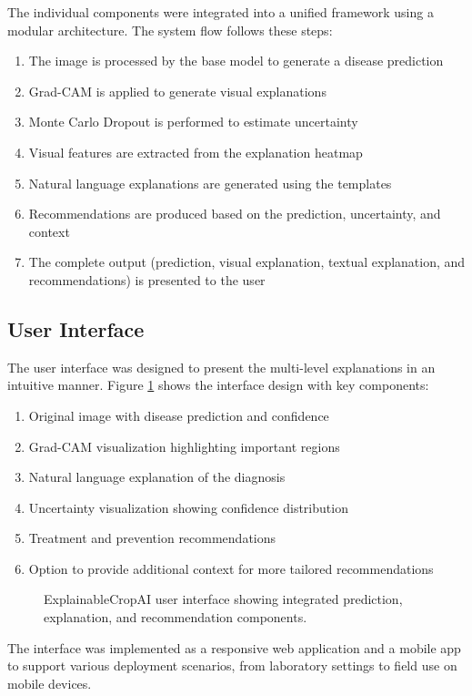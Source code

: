 The individual components were integrated into a unified framework using a modular architecture. The system flow follows these steps:

\begin{enumerate}
    \item The image is processed by the base model to generate a disease prediction
    \item Grad-CAM is applied to generate visual explanations
    \item Monte Carlo Dropout is performed to estimate uncertainty
    \item Visual features are extracted from the explanation heatmap
    \item Natural language explanations are generated using the templates
    \item Recommendations are produced based on the prediction, uncertainty, and context
    \item The complete output (prediction, visual explanation, textual explanation, and recommendations) is presented to the user
\end{enumerate}

\subsection{User Interface}

The user interface was designed to present the multi-level explanations in an intuitive manner. Figure \ref{fig:user-interface} shows the interface design with key components:

\begin{enumerate}
    \item Original image with disease prediction and confidence
    \item Grad-CAM visualization highlighting important regions
    \item Natural language explanation of the diagnosis
    \item Uncertainty visualization showing confidence distribution
    \item Treatment and prevention recommendations
    \item Option to provide additional context for more tailored recommendations
\end{enumerate}

\begin{figure}[ht]
    \centering
    \caption{ExplainableCropAI user interface showing integrated prediction, explanation, and recommendation components.}
    \label{fig:user-interface}
\end{figure}

The interface was implemented as a responsive web application and a mobile app to support various deployment scenarios, from laboratory settings to field use on mobile devices.
